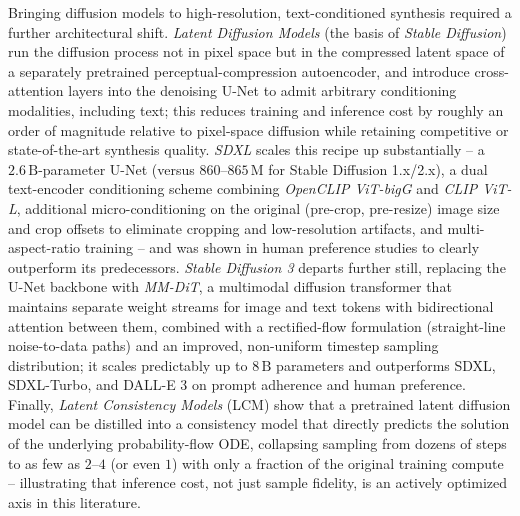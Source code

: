Bringing diffusion models to high-resolution, text-conditioned synthesis required a further architectural shift. \textit{Latent Diffusion Models} (the basis of \textit{Stable Diffusion}) \cite{rombachHighResolutionImageSynthesis2022} run the diffusion process not in pixel space but in the compressed latent space of a separately pretrained perceptual-compression autoencoder, and introduce cross-attention layers into the denoising U-Net to admit arbitrary conditioning modalities, including text; this reduces training and inference cost by roughly an order of magnitude relative to pixel-space diffusion while retaining competitive or state-of-the-art synthesis quality. \textit{SDXL} \cite{podellSDXLImprovingLatent2023} scales this recipe up substantially -- a $2.6\,\mathrm{B}$-parameter U-Net (versus $860$--$865\,\mathrm{M}$ for Stable Diffusion 1.x/2.x), a dual text-encoder conditioning scheme combining \textit{OpenCLIP ViT-bigG} and \textit{CLIP ViT-L}, additional micro-conditioning on the original (pre-crop, pre-resize) image size and crop offsets to eliminate cropping and low-resolution artifacts, and multi-aspect-ratio training -- and was shown in human preference studies to clearly outperform its predecessors. \textit{Stable Diffusion 3} \cite{esserScalingRectifiedFlow2024} departs further still, replacing the U-Net backbone with \textit{MM-DiT}, a multimodal diffusion transformer that maintains separate weight streams for image and text tokens with bidirectional attention between them, combined with a rectified-flow formulation (straight-line noise-to-data paths) and an improved, non-uniform timestep sampling distribution; it scales predictably up to $8\,\mathrm{B}$ parameters and outperforms SDXL, SDXL-Turbo, and DALL-E 3 on prompt adherence and human preference. Finally, \textit{Latent Consistency Models} (LCM) \cite{luoLatentConsistencyModels2023} show that a pretrained latent diffusion model can be distilled into a consistency model that directly predicts the solution of the underlying probability-flow ODE, collapsing sampling from dozens of steps to as few as $2$--$4$ (or even $1$) with only a fraction of the original training compute -- illustrating that inference cost, not just sample fidelity, is an actively optimized axis in this literature.

